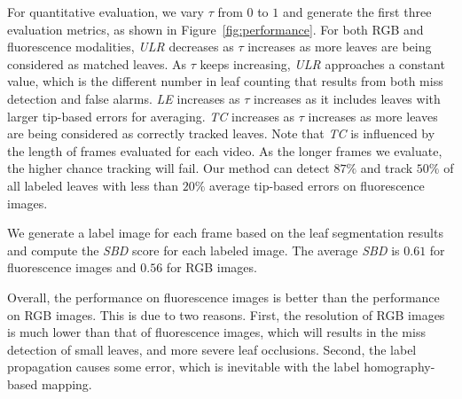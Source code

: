 For quantitative evaluation, we vary $\tau$ from $0$ to $1$ and generate the first three evaluation metrics, as shown in Figure~\ref{fig:performance}.
For both RGB and fluorescence modalities, {\it{ULR}} decreases as $\tau$ increases as more leaves are being considered as matched leaves.
As $\tau$ keeps increasing, {\it{ULR}} approaches a constant value, which is the different number in leaf counting that results from both miss detection and false alarms.
{\it{LE}} increases as $\tau$ increases as it includes leaves with larger tip-based errors for averaging.
{\it{TC}} increases as $\tau$ increases as more leaves are being considered as correctly tracked leaves.
Note that {\it{TC}} is influenced by the length of frames evaluated for each video.
As the longer frames we evaluate, the higher chance tracking will fail.
Our method can detect $87\%$ and track $50\%$ of all labeled leaves with less than $20\%$ average tip-based errors on fluorescence images. 

We generate a label image for each frame based on the leaf segmentation results and compute the {\it{SBD}} score for each labeled image.
The average {\it{SBD}} is $0.61$ for fluorescence images and $0.56$ for RGB images. 

Overall, the performance on fluorescence images is better than the performance on RGB images.
This is due to two reasons. 
First, the resolution of RGB images is much lower than that of fluorescence images, which will results in the miss detection of small leaves, and more severe leaf occlusions. 
Second, the label propagation causes some error, which is inevitable with the label homography-based mapping. 











